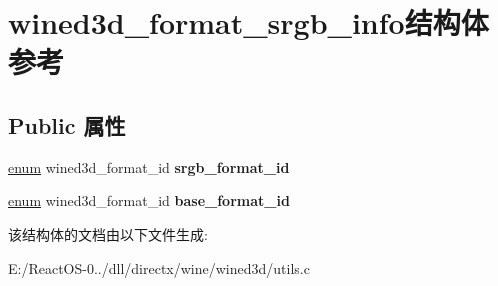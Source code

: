 \hypertarget{structwined3d__format__srgb__info}{}\section{wined3d\+\_\+format\+\_\+srgb\+\_\+info结构体 参考}
\label{structwined3d__format__srgb__info}
\subsection*{Public 属性}
\begin{DoxyCompactItemize}
\item 
\mbox{\label{structwined3d__format__srgb__info_a682487c91b755a63c4a7e49bb7d894b5}} 
\hyperlink{interfaceenum}{enum} wined3d\+\_\+format\+\_\+id {\bfseries srgb\+\_\+format\+\_\+id}
\item 
\mbox{\label{structwined3d__format__srgb__info_a08a8d6abaf0acd37ebd459f223af8195}} 
\hyperlink{interfaceenum}{enum} wined3d\+\_\+format\+\_\+id {\bfseries base\+\_\+format\+\_\+id}
\end{DoxyCompactItemize}


该结构体的文档由以下文件生成\+:\begin{DoxyCompactItemize}
\item 
E\+:/\+React\+O\+S-\/0../dll/directx/wine/wined3d/utils.\+c\end{DoxyCompactItemize}
